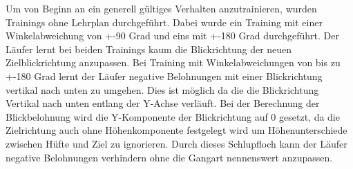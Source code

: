 Um von Beginn an ein generell gültiges Verhalten anzutrainieren, wurden Trainings ohne Lehrplan durchgeführt. Dabei wurde ein Training mit einer Winkelabweichung von +-90 Grad und eins mit +-180 Grad durchgeführt. Der Läufer lernt bei beiden Trainings kaum die Blickrichtung der neuen Zielblickrichtung anzupassen. Bei Training mit Winkelabweichungen von bis zu +-180 Grad lernt der Läufer negative Belohnungen mit einer Blickrichtung vertikal nach unten zu umgehen. Dies ist möglich da die die Blickrichtung Vertikal nach unten entlang der Y-Achse verläuft. Bei der Berechnung der Blickbelohnung wird die Y-Komponente der Blickrichtung auf 0 gesetzt, da die Zielrichtung auch ohne Höhenkomponente festgelegt wird um Höhenunterschiede zwischen Hüfte und Ziel zu ignorieren. Durch dieses Schlupfloch kann der Läufer negative Belohnungen verhindern ohne die Gangart nennenswert anzupassen.

